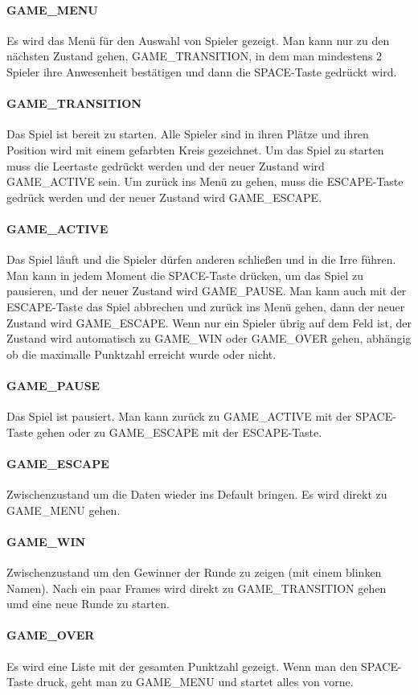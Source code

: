 \documentclass[doktyp=studarbeit]{TUBAFarbeiten}
\begin{document}
\paragraph{GAME\_MENU}
Es wird das Menü für den Auswahl von Spieler gezeigt. Man kann nur zu den
nächsten Zustand gehen, GAME\_TRANSITION, in dem man mindestens 2 Spieler
ihre Anwesenheit bestätigen und dann die SPACE-Taste gedrückt wird.
\paragraph{GAME\_TRANSITION}
Das Spiel ist bereit zu starten. Alle Spieler sind in ihren Plätze und ihren
Position wird mit einem gefarbten Kreis gezeichnet. Um das Spiel zu starten
muss die Leertaste gedrückt werden und der neuer Zustand wird GAME\_ACTIVE sein.
Um zurück ins Menü zu gehen, muss die ESCAPE-Taste gedrück werden und der neuer
Zustand wird GAME\_ESCAPE.
\paragraph{GAME\_ACTIVE}
Das Spiel läuft und die Spieler dürfen anderen schließen und in die Irre führen.
Man kann in jedem Moment die SPACE-Taste drücken, um das Spiel zu pausieren,
und der neuer Zustand wird GAME\_PAUSE. Man kann auch mit der ESCAPE-Taste das
Spiel abbrechen und zurück ins Menü gehen, dann der neuer Zustand wird 
GAME\_ESCAPE. Wenn nur ein Spieler übrig auf dem Feld ist, der Zustand wird 
automatisch zu GAME\_WIN oder GAME\_OVER gehen, abhängig ob die maximalle 
Punktzahl erreicht wurde oder nicht.
\paragraph{GAME\_PAUSE}
Das Spiel ist pausiert. Man kann zurück zu GAME\_ACTIVE mit der SPACE-Taste
gehen oder zu GAME\_ESCAPE mit der ESCAPE-Taste.
\paragraph{GAME\_ESCAPE}
Zwischenzustand um die Daten wieder ins Default bringen. Es wird direkt zu 
GAME\_MENU gehen.
\paragraph{GAME\_WIN}
Zwischenzustand um den Gewinner der Runde zu zeigen (mit einem blinken Namen).
Nach ein paar Frames wird direkt zu GAME\_TRANSITION gehen umd eine neue Runde
zu starten. 
\paragraph{GAME\_OVER}
Es wird eine Liste mit der gesamten Punktzahl gezeigt. Wenn man den SPACE-Taste
druck, geht man zu GAME\_MENU und startet alles von vorne.
\end{document}
